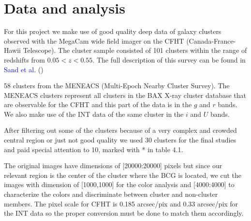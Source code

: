 \chapter{Data and analysis}

For this project we make use of good quality deep data of galaxy clusters observed with the MegaCam wide field imager on the CFHT (Canada-France-Hawii Telescope). The cluster sample consisted of 101 clusters within the range of redshifts from $0.05<z<0.55$. The full description of this survey can be found in \textcolor{blue}{Sand et al.} (\citeyear{Reference11})

58 clusters from the MENEACS (Multi-Epoch Nearby Cluster Survey). The MENEACS clusters represent all clusters in the BAX X-ray cluster database that are observable for the CFHT and this part of the data is in the $g$ and $r$ bands. We also make use of the INT data of the same cluster in the $i$ and $U$ bands. 

After filtering out some of the clusters because of a very complex and crowded central region or just not good quality we used 30 clusters for the final studies and paid special attention to 10, marked with * in table 4.1.

The original images have dimensions of [20000:20000] pixels but since our relevant region is the center of the cluster where the BCG is located, we cut the images with dimension of [1000,1000] for the color analysis and [4000:4000] to characterize the colors and discriminate between cluster and non-cluster members. The pixel scale for CFHT is 0.185 arcsec/pix and 0.33 arcsec/pix for the INT data so the proper conversion must be done to match them accordingly.

